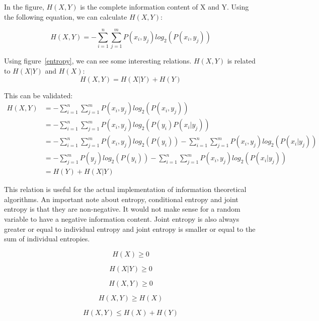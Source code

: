 In the figure, $H(X,Y)$ is the complete information content of X and Y. Using the following equation, we can calculate $H(X,Y)$:

\begin{equation}
H(X,Y) = -\sum_{i=1}^{n}\sum_{j=1}^{m}P(x_i, y_j)log_2(P(x_i, y_j))
\end{equation}

Using figure~\ref{entropy}, we can see some interesting relations. $H(X,Y)$ is related to $H(X|Y)$ and $H(X)$:
\begin{equation}\label{joint}
H(X,Y) = H(X|Y) + H(Y)
\end{equation}

This can be validated:
\begin{align*}
H(X,Y) &= -\sum_{i=1}^{n}\sum_{j=1}^{m}P(x_i, y_j)log_2(P(x_i, y_j))\\
&= -\sum_{i=1}^{n}\sum_{j=1}^{m}P(x_i, y_j)log_2(P(y_i)P(x_i | y_j))\\
&= -\sum_{i=1}^{n}\sum_{j=1}^{m}P(x_i, y_j)log_2(P(y_i))-\sum_{i=1}^{n}\sum_{j=1}^{m}P(x_i, y_j)log_2(P(x_i | y_j))\\
&= -\sum_{j=1}^{m}P(y_j)log_2(P(y_i))-\sum_{i=1}^{n}\sum_{j=1}^{m}P(x_i, y_j)log_2(P(x_i | y_j))\\
&= H(Y) + H(X|Y)
\end{align*}

This relation is useful for the actual implementation of information theoretical algorithms. An important note about entropy, conditional entropy and joint entropy is that they are non-negative. It would not make sense for a random variable to have a negative information content. Joint entropy is also always greater or equal to individual entropy and joint entropy is smaller or equal to the sum of individual entropies.

\begin{equation}
H(X) \ge 0
\end{equation}

\begin{equation}
H(X|Y) \ge 0
\end{equation}

\begin{equation}
H(X,Y) \ge 0
\end{equation}

\begin{equation}
H(X,Y) \ge H(X)
\end{equation}

\begin{equation}
H(X,Y) \le H(X) + H(Y) 
\end{equation}

